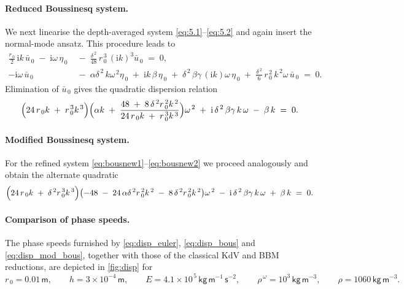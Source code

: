 \documentclass[alpha-refs, 12pt]{wiley-article}
\newcommand{\ui}{\mathrm{i}}
\begin{document}
\paragraph{Reduced Boussinesq system.} We next linearise the depth-averaged system \eqref{eq:5.1}--\eqref{eq:5.2} and again insert the normal-mode ansatz. This procedure leads to
\begin{align}
  \frac{r_{\,0}}{2}\,\ui k\,\bar{u}_{\,0}\;-\;\ui\omega\,\eta_{\,0}
  &\;-\;\frac{\delta^{\,2}}{48}\,r_{\,0}^{\,3}\,(\ui k)^{3}\bar{u}_{\,0}
  \;=\;0, \label{eq:lin_red1}\\
  -\ui\omega\,\bar{u}_{\,0}
  &\;-\;\alpha\delta^{\,2}\,k\omega^{\,2}\eta_{\,0}
  \;+\;\ui k\,\beta\,\eta_{\,0}
  \;+\;\delta^{\,2}\,\beta\gamma\,(\ui k)\omega\,\eta_{\,0}
  \;+\;\frac{\delta^{\,2}}{6}\,r_{\,0}^{\,2}\,k^{\,2}\omega\,\bar{u}_{\,0}
  \;=\;0. \label{eq:lin_red2}
\end{align}
Elimination of $\bar{u}_{\,0}$ gives the quadratic dispersion relation
\begin{equation}\label{eq:disp_bous}
  \Bigl(24\,r_{\,0}k\;+\;r_{\,0}^{\,3}k^{\,3}\Bigr)\Bigl(\alpha k\;+\;
  \frac{48\;+\;8\,\delta^{\,2}r_{\,0}^{\,2}k^{\,2}}{24\,r_{\,0}k\;+\;r_{\,0}^{\,3}k^{\,3}}\Bigr)\omega^{\,2}
  \;+\;\ui\,\delta^{\,2}\,\beta\gamma\,k\,\omega\;-\;\beta\,k\;=\;0.
\end{equation}

\paragraph{Modified Boussinesq system.} For the refined system \eqref{eq:bousnew1}--\eqref{eq:bousnew2} we proceed analogously and obtain the alternate quadratic
\begin{equation}\label{eq:disp_mod_bous}
  \Bigl(24\,r_{\,0}k\;+\;\delta^{\,2}r_{\,0}^{\,3}k^{\,3}\Bigr)
  \bigl(-48\;-\;24\,\alpha\delta^{\,2}r_{\,0}^{\,2}k^{\,2}\;
  -\;8\,\delta^{\,2}r_{\,0}^{\,2}k^{\,2}\bigr)\omega^{\,2}
  \;-\;\ui\,\delta^{\,2}\,\beta\gamma\,k\,\omega
  \;+\;\beta\,k\;=\;0.
\end{equation}

\paragraph{Comparison of phase speeds.} The phase speeds furnished by \eqref{eq:disp_euler}, \eqref{eq:disp_bous} and \eqref{eq:disp_mod_bous}, together with those of the classical KdV and BBM reductions, are depicted in \cref{fig:disp} for
\[
  r_{\,0}=0.01\,\mathsf{m}, \qquad
  h=3\times10^{-4}\,\mathsf{m}, \qquad
  E=4.1\times10^{\,5}\,\mathsf{kg}\,\mathsf{m}^{-1}\,\mathsf{s}^{-2}, \qquad
  \rho^{\,\omega}=10^{3}\,\mathsf{kg}\,\mathsf{m}^{-3}, \qquad
  \rho=1060\,\mathsf{kg}\,\mathsf{m}^{-3}.
\]
\end{document}
